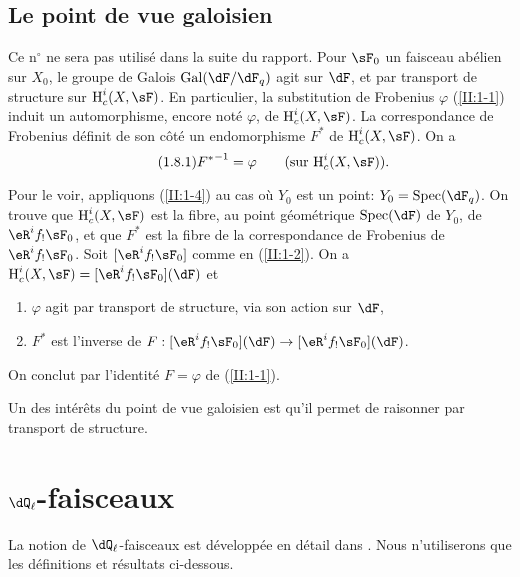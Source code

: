 \subsection{Le point de vue galoisien}\label{II:1-8}

Ce n$^\circ$ ne sera pas utilisé dans la suite du rapport. Pour $\sF_0$ un 
faisceau abélien sur $X_0$, le groupe de Galois $\gal(\dF/\dF_q)$ agit sur 
$\dF$, et par transport de structure sur $\h_c^i(X,\sF)$. En particulier, la 
substitution de Frobenius $\varphi$ (\ref{II:1-1}) induit un automorphisme, 
encore noté $\varphi$, de $\h_c^i(X,\sF)$. La correspondance de Frobenius 
définit de son côté un endomorphisme $F^*$ de $\h_c^i(X,\sF)$. On a 
\begin{equation*}\tag{1.8.1}\label{II:eq:1-8-1}
  {F^*}^{-1} = \varphi \qquad \text{(sur $\h_c^i(X,\sF)$).}
\end{equation*}

Pour le voir, appliquons (\ref{II:1-4}) au cas où $Y_0$ est un point: 
$Y_0=\spec(\dF_q)$. On trouve que $\h_c^i(X,\sF)$ est la fibre, au point 
géométrique $\spec(\dF)$ de $Y_0$, de $\eR^i f_! \sF_0$, et que $F^*$ est 
la fibre de la correspondance de Frobenius de $\eR^i f_!\sF_0$. Soit 
$[\eR^i f_! \sF_0]$ comme en (\ref{II:1-2}). On a 
$\h_c^i(X,\sF) = [\eR^i f_!\sF_0](\dF)$ et 
\begin{enumerate}[\indent a)]
  \item $\varphi$ agit par transport de structure, via son action sur $\dF$, 
  \item $F^*$ est l'inverse de 
    $F:[\eR^i f_!\sF_0](\dF) \to [\eR^i f_!\sF_0](\dF)$. 
\end{enumerate}

On conclut par l'identité $F=\varphi$ de (\ref{II:1-1}). 

Un des intérêts du point de vue galoisien est qu'il permet de raisonner par 
transport de structure. 










\section{\texorpdfstring{$\dQ_\ell$}{Ql}-faisceaux}\label{II:2}

La notion de $\dQ_\ell$-faisceaux est développée en détail dans 
\cite[V,VI]{sga5}. Nous n'utiliserons que les définitions et résultats 
ci-dessous. 





